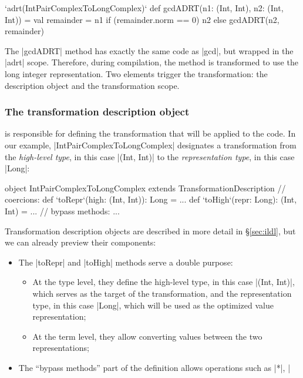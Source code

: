 \begin{lstlisting-nobreak}
`adrt(IntPairComplexToLongComplex)` {
  def gcdADRT(n1: (Int, Int), n2: (Int, Int)) = {
    val remainder = n1 %
    if (remainder.norm == 0) n2 else gcdADRT(n2, remainder)
  }
}
\end{lstlisting-nobreak}

The |gcdADRT| method has exactly the same code as |gcd|, but wrapped in the |adrt| scope. Therefore, during compilation, the method is transformed to use the long integer representation. Two elements trigger the transformation: the  description object and the transformation scope.

\subsubsection{The transformation description object} is responsible for defining the transformation that will be applied to the code. In our example, |IntPairComplexToLongComplex| designates a transformation from the \emph{high-level type}, in this case |(Int, Int)| to the \emph{representation type}, in this case |Long|:

\begin{lstlisting-nobreak}
object IntPairComplexToLongComplex
          extends TransformationDescription {
  // coercions:
  def `toRepr`(high: (Int, Int)): Long = ...
  def `toHigh`(repr: Long): (Int, Int) = ...
  // bypass methods:
  ...
}
\end{lstlisting-nobreak}

\noindent
Transformation description objects are described in more detail in \S\ref{sec:ildl}, but we can already preview their components:

\vspace{0.35em}
\begin{itemize}
  \item The |toRepr| and |toHigh| methods serve a double purpose:
  \begin{itemize}
    \item At the type level, they define the high-level type, in this case |(Int, Int)|, which serves as the target of the transformation, and the representation type, in this case |Long|, which will be used as the optimized value representation;
    \item At the term level, they allow converting values between the two representations;
  \end{itemize}
  \item The ``bypass methods'' part of the definition allows operations such as |*|, |%
\end{itemize}
\vspace{0.35em}

